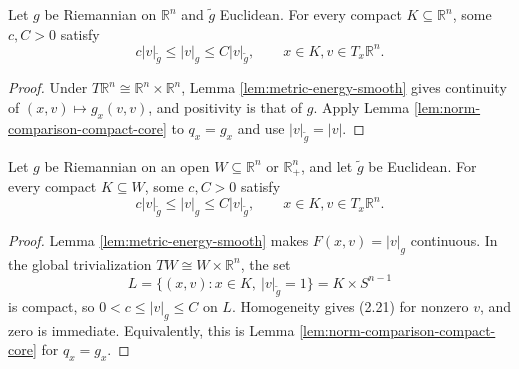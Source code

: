 \begin{lemma}
\label{lem:riemannian-euclidean-norm-comparison-flat}





Let $g$ be Riemannian on $\mathbb R^n$ and $\widetilde g$ Euclidean. For every compact $K\subseteq\mathbb R^n$, some $c,C>0$ satisfy
\[
c|v|_{\widetilde g}\le|v|_g\le C|v|_{\widetilde g},
\qquad x\in K, v\in T_x\mathbb R^n.
\]
\end{lemma}
\begin{proof}

\sketch Under $T\mathbb R^n\cong\mathbb R^n\times\mathbb R^n$, Lemma \ref{lem:metric-energy-smooth} gives continuity of $(x,v)\mapsto g_x(v,v)$, and positivity is that of $g$. Apply Lemma \ref{lem:norm-comparison-compact-core} to $q_x=g_x$ and use $|v|_{\widetilde g}=|v|$.
\end{proof}

\begin{lemma}
\label{lem:riemannian-euclidean-norm-comparison}





Let $g$ be Riemannian on an open $W\subseteq\mathbb R^n$ or $\mathbb R^n_+$, and let $\widetilde g$ be Euclidean. For every compact $K\subseteq W$, some $c,C>0$ satisfy
\begin{equation}
c|v|_{\widetilde g}\le|v|_g\le C|v|_{\widetilde g},
\qquad x\in K, v\in T_x\mathbb R^n.
\tag{2.21}
\end{equation}
\end{lemma}
\begin{proof}

\sketch Lemma \ref{lem:metric-energy-smooth} makes $F(x,v)=|v|_g$ continuous. In the global trivialization $TW\cong W\times\mathbb R^n$, the set
\[
L=\{(x,v):x\in K,\ |v|_{\widetilde g}=1\}=K\times S^{n-1}
\]
is compact, so $0<c\le|v|_g\le C$ on $L$. Homogeneity gives (2.21) for nonzero $v$, and zero is immediate. Equivalently, this is Lemma \ref{lem:norm-comparison-compact-core} for $q_x=g_x$.
\end{proof}

